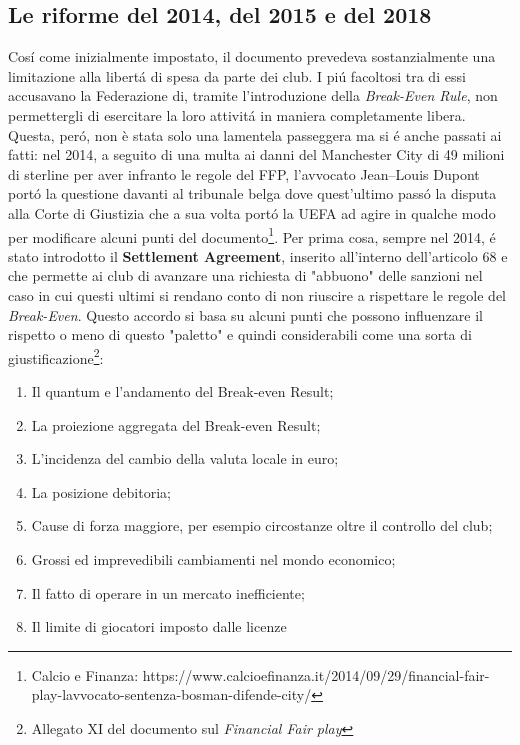 \documentclass[
    corpo=12pt,
    oneside,
    evenboxes,
    tipotesi=triennale,
    stile=classica,
    oldstyle,
    autoretitolo,
    greek,
]{toptesi}
\begin{document}
\begin{interlinea}{1.5}
\subsection{Le riforme del 2014, del 2015 e del 2018}
Cos\'i come inizialmente impostato, il documento prevedeva sostanzialmente una limitazione alla libert\'a di spesa da parte dei club. 
I pi\'u facoltosi tra di essi accusavano la Federazione di, tramite l'introduzione della \emph{Break-Even Rule}, non permettergli di 
esercitare la loro attivit\'a in maniera completamente libera. Questa, per\'o, non è stata solo una lamentela passeggera
ma si \'e anche passati ai fatti: nel 2014, a seguito di una multa ai danni del Manchester City di 49 milioni di sterline per aver infranto 
le regole del FFP, l'avvocato Jean–Louis Dupont port\'o la questione davanti al tribunale belga dove quest'ultimo pass\'o la disputa alla 
Corte di Giustizia che a sua volta port\'o la UEFA ad agire in qualche modo per modificare alcuni punti del documento\footnote{Calcio e Finanza: https://www.calcioefinanza.it/2014/09/29/financial-fair-play-lavvocato-sentenza-bosman-difende-city/}.\newline
Per prima cosa, sempre nel 2014, \'e stato introdotto il \textbf{Settlement Agreement}, inserito all'interno dell'articolo 68 e che permette
ai club di avanzare una richiesta di "abbuono" delle sanzioni nel caso in cui questi ultimi si rendano conto di non riuscire a rispettare le regole del 
\emph{Break-Even}. Questo accordo si basa su alcuni punti che possono influenzare il rispetto o meno di questo "paletto" e quindi considerabili
come una sorta di giustificazione\footnote{Allegato XI del documento sul \emph{Financial Fair play}}:
\begin{enumerate}
    \item Il quantum e l’andamento del Break-even Result;
    \item La proiezione aggregata del Break-even Result;
    \item L’incidenza del cambio della valuta locale in euro;
    \item La posizione debitoria;
    \item Cause di forza maggiore, per esempio circostanze oltre il controllo del club;
    \item Grossi ed imprevedibili cambiamenti nel mondo economico;
    \item Il fatto di operare in un mercato inefficiente;
    \item Il limite di giocatori imposto dalle licenze
\end{enumerate}

\end{interlinea}
\end{document}
